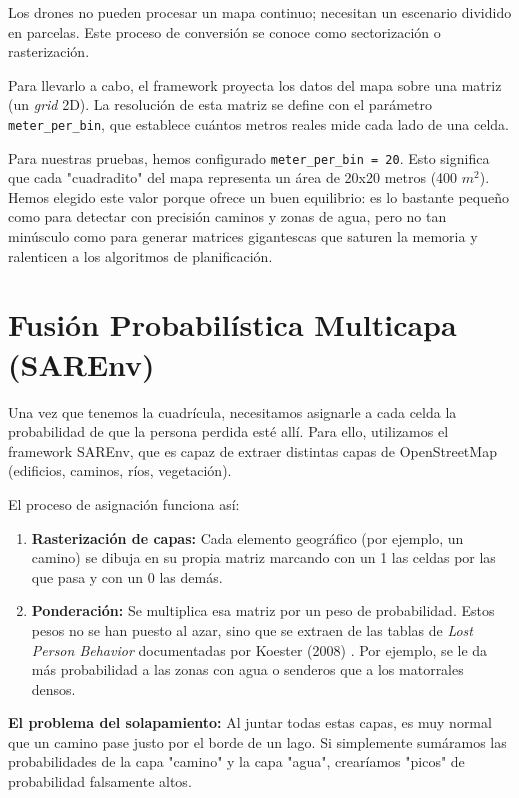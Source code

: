 Los drones no pueden procesar un mapa continuo; necesitan un escenario dividido en parcelas. Este proceso de conversión se conoce como sectorización o rasterización.

Para llevarlo a cabo, el framework proyecta los datos del mapa sobre una matriz (un \textit{grid} 2D). La resolución de esta matriz se define con el parámetro \texttt{meter\_per\_bin}, que establece cuántos metros reales mide cada lado de una celda.

Para nuestras pruebas, hemos configurado \texttt{meter\_per\_bin = 20}. Esto significa que cada "cuadradito" del mapa representa un área de 20x20 metros (400 $m^2$). Hemos elegido este valor porque ofrece un buen equilibrio: es lo bastante pequeño como para detectar con precisión caminos y zonas de agua, pero no tan minúsculo como para generar matrices gigantescas que saturen la memoria y ralenticen a los algoritmos de planificación.

\section{Fusión Probabilística Multicapa (SAREnv)}

Una vez que tenemos la cuadrícula, necesitamos asignarle a cada celda la probabilidad de que la persona perdida esté allí. Para ello, utilizamos el framework SAREnv, que es capaz de extraer distintas capas de OpenStreetMap (edificios, caminos, ríos, vegetación).

El proceso de asignación funciona así:
\begin{enumerate}
    \item \textbf{Rasterización de capas:} Cada elemento geográfico (por ejemplo, un camino) se dibuja en su propia matriz marcando con un 1 las celdas por las que pasa y con un 0 las demás.
    \item \textbf{Ponderación:} Se multiplica esa matriz por un peso de probabilidad. Estos pesos no se han puesto al azar, sino que se extraen de las tablas de \textit{Lost Person Behavior} documentadas por Koester (2008) \cite{koester2008}. Por ejemplo, se le da más probabilidad a las zonas con agua o senderos que a los matorrales densos.
\end{enumerate}

\textbf{El problema del solapamiento:} Al juntar todas estas capas, es muy normal que un camino pase justo por el borde de un lago. Si simplemente sumáramos las probabilidades de la capa "camino" y la capa "agua", crearíamos "picos" de probabilidad falsamente altos. 

